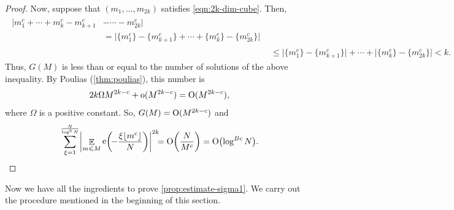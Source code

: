 \documentclass[letterpaper, 12pt]{article}
\theoremstyle{plain}
\theoremstyle{definition}
\theoremstyle{plain}
\theoremstyle{plain}
\numberwithin{equation}{section}
\newcommand{\Oh}{{\rm O}}
\newcommand{\oh}{{\rm o}}
\renewcommand{\leq}{\leqslant}
\newcommand{\E}{\mathbb{E}}
\newcommand{\1}{\textbf{1}}
\DeclarePairedDelimiter\floor{\lfloor}{\rfloor}
\DeclareMathOperator{\e}{e}
\begin{document}
\begin{proof}
    Now, suppose that $(m_1, \ldots, m_{2k})$ satisfies \cref{eqn:2k-dim-cube}. Then,
    \begin{align}
        \begin{split}\nonumber
            \bigl\lvert m_1^c + \cdots + m_k^c - m_{k + 1}^c &- \cdots - m_{2k}^c \bigr\rvert\\
            &= \bigl\lvert \{m_1^c\} - \{m_{k + 1}^c\} + \cdots + \{m_k^c\} - \{m_{2k}^c\} \bigr\rvert
        \end{split}\\ 
        &\leq \bigl\lvert \{m_1^c\} - \{m_{k + 1}^c\} \bigr\rvert + \cdots + \bigl\lvert \{m_k^c\} - \{m_{2k}^c\} \bigr\rvert < k. \label{eqn:diophantine-inequality}
    \end{align}
    Thus, $G(M)$ is less than or equal to the number of solutions of the above inequality. By Poulias (\cref{thm:poulias}), this number is 
    \[
        2k \Omega M^{2k - c} + \oh(M^{2k - c}) = \Oh(M^{2k - c}),
    \]
    where $\Omega$ is a positive constant. So, $G(M) = \Oh(M^{2k - c})$ and 
    \begin{equation*}
       \sum_{\xi = 1}^{\frac{N}{\log^b N}} \biggl\lvert \mathop{\E}_{m \leq M} \e\biggl(\! -\frac{\xi \floor{m^c}}{N} \biggr) \biggr\rvert^{2k} \!\!\!
       = \Oh \biggl(\frac{N}{M^c} \biggr)
       = \Oh\bigl(\log^{Bc} N \bigr).
    \end{equation*}
\end{proof}

Now we have all the ingredients to prove \cref{prop:estimate-sigma1}. We carry out the procedure mentioned in the beginning of this section.
\end{document}

